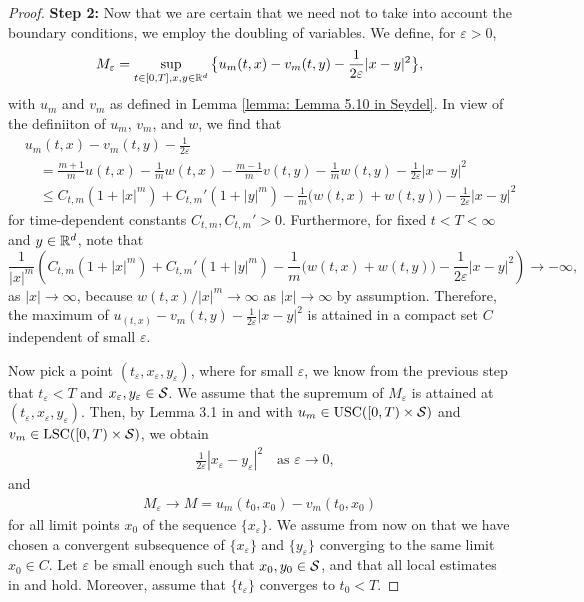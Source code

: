 \begin{proof}
    \textbf{Step 2:} Now that we are certain that we need not to take into account the boundary conditions, we employ the doubling of variables. We define, for $\varepsilon>0$, 
    \begin{equation*}
        M_\varepsilon = \sup_{t \in [0,T], x,y \in \mathbb{R}^d} \big\{u_m(t,x) - v_m(t,y) - \frac{1}{2\varepsilon}|x-y|^2\big\},
    \end{equation*}
    with $u_m$ and $v_m$ as defined in Lemma \ref{lemma: Lemma 5.10 in Seydel}. In view of the definiiton of $u_m$, $v_m$, and $w$, we find that
    \begin{align*}
        & u_m(t,x) - v_m(t,y) - \frac{1}{2\varepsilon} \\
        &\quad = \frac{m+1}{m}u(t,x) - \frac{1}{m}w(t,x) - \frac{m-1}{m}v(t,y) - \frac{1}{m}w(t,y) - \frac{1}{2 \varepsilon}|x-y|^2 \\
        & \quad \leq C_{t,m}(1+|x|^m) + C_{t,m}' (1+|y|^m) - \frac{1}{m}\big( w(t,x) + w(t,y) \big) - \frac{1}{2\varepsilon} |x-y|^2
    \end{align*}
    for time-dependent constants $C_{t,m}, C_{t,m}' > 0$. Furthermore, for fixed $t < T < \infty$ and $y \in \mathbb{R}^d$, note that
    \begin{equation*}
     \frac{1}{|x|^m} \left( C_{t,m}(1+|x|^m) + C_{t,m}' (1+|y|^m) - \frac{1}{m}\big( w(t,x) + w(t,y) \big) - \frac{1}{2\varepsilon} |x-y|^2 \right) \rightarrow - \infty,
    \end{equation*}
    as $|x| \rightarrow \infty$, because $w(t,x)/|x|^m \rightarrow \infty$ as $|x| \rightarrow \infty$ by assumption. Therefore, the maximum of $u_(t,x)-v_m(t,y)-\frac{1}{2 \varepsilon}|x-y|^2$ is attained in a compact set $C$ independent of small $\varepsilon$. 

    Now pick a point $(t_\varepsilon, x_\varepsilon, y_\varepsilon)$, where for small $\varepsilon$, we know from the previous step that $t_\varepsilon < T$ and $x_\varepsilon,y_\varepsilon \in \mathcal{S}$. We assume that the supremum of $M_\varepsilon$ is attained at $(t_\varepsilon,x_\varepsilon,y_\varepsilon)$. Then, by Lemma 3.1 in \cite{barles2008second} and with $u_m \in \operatorname{USC}([0,T) \times \mathcal{S})$ and $v_m \in \operatorname{LSC}([0,T) \times \mathcal{S})$, we obtain 
    \begin{align*}
        & \frac{1}{2 \varepsilon} |x_\varepsilon - y_\varepsilon|^2 \quad \text{as } \varepsilon \rightarrow 0,
    \end{align*}
    and 
    \begin{align*}
        M_\varepsilon \rightarrow M = u_m(t_0,x_0) - v_m(t_0,x_0)
    \end{align*}
    for all limit points $x_0$ of the sequence $\{x_\varepsilon\}$. We assume from now on that we have chosen a convergent subsequence of $\{x_\varepsilon\}$ and $\{y_\varepsilon\}$ converging to the same limit $x_0 \in C$. Let $\varepsilon$ be small enough such that $x_0,y_0 \in \mathcal{S}$, and that all local estimates in  and  hold. Moreover, assume that $\{t_\varepsilon\}$ converges to $t_0 < T$. 
    

\end{proof}
